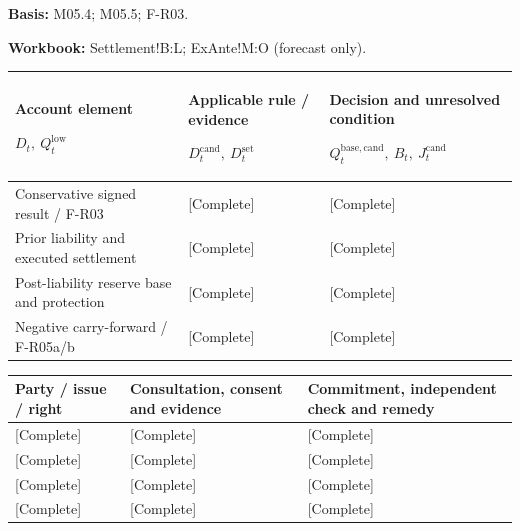 \textbf{Basis:} M05.4; M05.5; F-R03.\par
\textbf{Workbook:} Settlement!B:L; ExAnte!M:O (forecast only).\par\endgroup
{\sffamily\fontsize{8.3}{10.3}\selectfont\begin{longtable}{@{}P{64.34mm} P{49.49mm} P{51.14mm}@{}}
\toprule
\textbf{Account element}\par {\normalfont\fontsize{8.2}{10}\selectfont $D_t,\ Q_t^{\mathrm{low}}$} & \textbf{Applicable rule / evidence}\par {\normalfont\fontsize{8.2}{10}\selectfont $D_t^{\mathrm{cand}},\ D_t^{\mathrm{set}}$} & \textbf{Decision and unresolved condition}\par {\normalfont\fontsize{8.2}{10}\selectfont $Q_t^{\mathrm{base,cand}},\ B_t,\ J_t^{\mathrm{cand}}$}\\\midrule\endhead
\rule{0pt}{7.7mm}Conservative signed result / F-R03 & [Complete] & [Complete]\\\hline
\rule{0pt}{7.7mm}Prior liability and executed settlement & [Complete] & [Complete]\\\hline
\rule{0pt}{7.7mm}Post-liability reserve base and protection & [Complete] & [Complete]\\\hline
\rule{0pt}{7.7mm}Negative carry-forward / F-R05a/b & [Complete] & [Complete]\\\hline
\end{longtable}}
{\sffamily\fontsize{8.3}{10.3}\selectfont\begin{longtable}{@{}P{47.84mm} P{57.74mm} P{59.39mm}@{}}
\toprule
\textbf{Party / issue / right} & \textbf{Consultation, consent and evidence} & \textbf{Commitment, independent check and remedy}\\\midrule\endhead
\rule{0pt}{7.7mm}[Complete] & [Complete] & [Complete]\\\hline
\rule{0pt}{7.7mm}[Complete] & [Complete] & [Complete]\\\hline
\rule{0pt}{7.7mm}[Complete] & [Complete] & [Complete]\\\hline
\rule{0pt}{7.7mm}[Complete] & [Complete] & [Complete]\\\hline
\end{longtable}}
